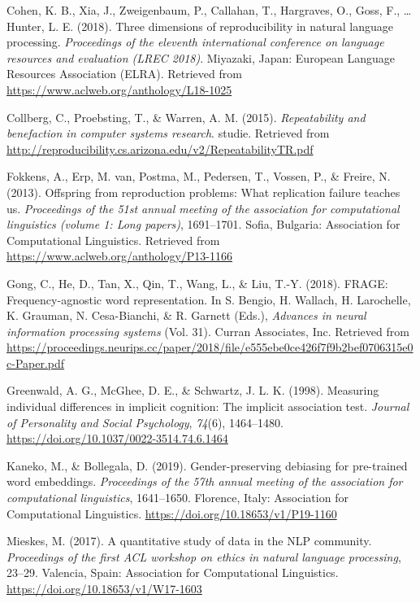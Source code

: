 \documentclass[
  english,
  man,floatsintext]{apa6}
\begin{document}
\leavevmode\hypertarget{ref-cohen_2018}{}%
Cohen, K. B., Xia, J., Zweigenbaum, P., Callahan, T., Hargraves, O., Goss, F., \ldots{} Hunter, L. E. (2018). Three dimensions of reproducibility in natural language processing. \emph{Proceedings of the eleventh international conference on language resources and evaluation (LREC 2018)}. Miyazaki, Japan: European Language Resources Association (ELRA). Retrieved from \url{https://www.aclweb.org/anthology/L18-1025}

\leavevmode\hypertarget{ref-collberg_2015}{}%
Collberg, C., Proebsting, T., \& Warren, A. M. (2015). \emph{Repeatability and benefaction in computer systems research}. studie. Retrieved from \url{http://reproducibility.cs.arizona.edu/v2/RepeatabilityTR.pdf}

\leavevmode\hypertarget{ref-fokkens_2013}{}%
Fokkens, A., Erp, M. van, Postma, M., Pedersen, T., Vossen, P., \& Freire, N. (2013). Offspring from reproduction problems: What replication failure teaches us. \emph{Proceedings of the 51st annual meeting of the association for computational linguistics (volume 1: Long papers)}, 1691--1701. Sofia, Bulgaria: Association for Computational Linguistics. Retrieved from \url{https://www.aclweb.org/anthology/P13-1166}

\leavevmode\hypertarget{ref-gong_2018}{}%
Gong, C., He, D., Tan, X., Qin, T., Wang, L., \& Liu, T.-Y. (2018). FRAGE: Frequency-agnostic word representation. In S. Bengio, H. Wallach, H. Larochelle, K. Grauman, N. Cesa-Bianchi, \& R. Garnett (Eds.), \emph{Advances in neural information processing systems} (Vol. 31). Curran Associates, Inc. Retrieved from \url{https://proceedings.neurips.cc/paper/2018/file/e555ebe0ce426f7f9b2bef0706315e0c-Paper.pdf}

\leavevmode\hypertarget{ref-greenwald_1998}{}%
Greenwald, A. G., McGhee, D. E., \& Schwartz, J. L. K. (1998). Measuring individual differences in implicit cognition: The implicit association test. \emph{Journal of Personality and Social Psychology}, \emph{74}(6), 1464--1480. \url{https://doi.org/10.1037/0022-3514.74.6.1464}

\leavevmode\hypertarget{ref-kaneko_2019}{}%
Kaneko, M., \& Bollegala, D. (2019). Gender-preserving debiasing for pre-trained word embeddings. \emph{Proceedings of the 57th annual meeting of the association for computational linguistics}, 1641--1650. Florence, Italy: Association for Computational Linguistics. \url{https://doi.org/10.18653/v1/P19-1160}

\leavevmode\hypertarget{ref-mieskes_2017}{}%
Mieskes, M. (2017). A quantitative study of data in the NLP community. \emph{Proceedings of the first ACL workshop on ethics in natural language processing}, 23--29. Valencia, Spain: Association for Computational Linguistics. \url{https://doi.org/10.18653/v1/W17-1603}
\end{document}
